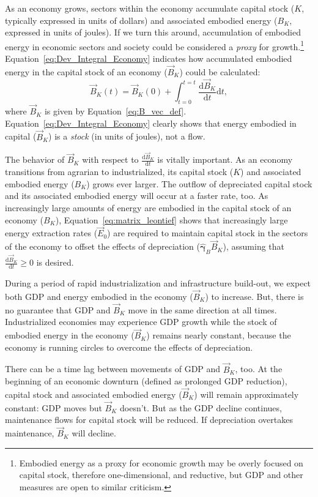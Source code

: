 As an economy grows,
sectors within the economy accumulate capital stock 
($K$, typically expressed in units of dollars)
and associated embodied energy 
($B_{K}$, expressed in units of joules).
If we turn this around, 
accumulation of embodied energy
in economic sectors and society 
could be considered a \emph{proxy} for growth.\footnote{Embodied energy 
	as a proxy for economic growth may be overly focused on capital stock, 
	therefore one-dimensional, and reductive, 
	but GDP and other measures are open to similar criticism.}
Equation~\ref{eq:Dev_Integral_Economy} indicates how accumulated
embodied energy in the capital stock 
of an economy ($\vec{B}_{K}$) could be calculated:
%
\begin{equation} \label{eq:Dev_Integral_Economy}
	\vec{B}_{K}(t) 
	= \vec{B}_{K}(0) 
	+ \int_{t=0}^{t=t} \frac{\mathrm{d}\vec{B}_{K}}{\mathrm{d}t}\mathrm{d}t,
\end{equation}
%
where $\vec{B}_{K}$ is given by Equation~\ref{eq:B_vec_def}.
Equation~\ref{eq:Dev_Integral_Economy} clearly shows
that energy embodied in capital ($\vec{B}_{K}$) 
is a \emph{stock} (in units of joules), not a flow.

The behavior of $\vec{B}_{K}$ 
with respect to
$\frac{\mathrm{d}\vec{B}_{K}}{\mathrm{d}t}$ 
is vitally important. 
As an economy transitions from agrarian to industrialized, 
its capital stock ($K$) and associated embodied energy ($B_{K}$)
grows ever larger. 
The outflow of depreciated capital stock and its associated embodied energy 
will occur at a faster rate, too.
As increasingly large amounts of energy are embodied 
in the capital stock of an economy ($B_{K}$), 
Equation~\ref{eq:matrix_leontief} shows that
increasingly large energy extraction rates ($\vec{E}_{0}$) 
are required to maintain capital stock 
in the sectors of the economy
to offset the effects of depreciation 
($\hat{\boldsymbol{\gamma}}_{B} \vec{B}_{K}$),
assuming that $\frac{\mathrm{d}\vec{B}_{K}}{\mathrm{d}t} \ge 0$ 
is desired. 

During a period of rapid industrialization and infrastructure build-out, 
we expect both GDP and energy embodied in the economy ($\vec{B}_{K}$)
to increase.
But, there is no guarantee that GDP and $\vec{B}_{K}$ move 
in the same direction at all times.
Industrialized economies may experience GDP growth while 
the stock of embodied energy in the economy ($\vec{B}_{K}$) remains nearly constant,
because the economy is running circles to overcome the effects of depreciation.

There can be a time lag between movements of GDP and $\vec{B}_{K}$, too.
At the beginning of an economic downturn (defined as prolonged GDP reduction),
capital stock and associated embodied energy ($\vec{B}_{K}$) will remain approximately constant:
GDP moves but $\vec{B}_{K}$ doesn't.
But as the GDP decline continues, 
maintenance flows for capital stock will be reduced.
If depreciation overtakes maintenance, $\vec{B}_{K}$ will decline. 


